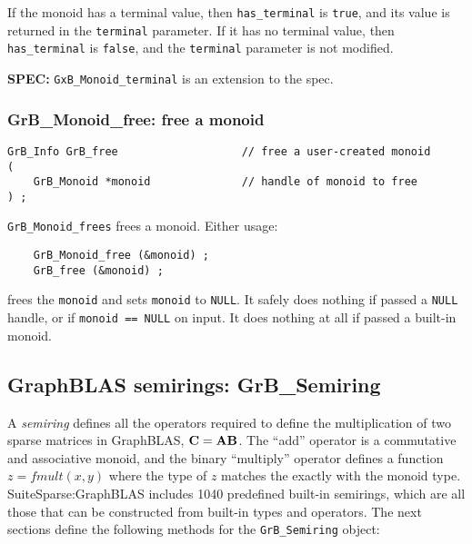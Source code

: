 \documentclass[12pt]{article}
\begin{document}
If the monoid has a terminal value, then \verb'has_terminal' is \verb'true',
and its value is returned in the \verb'terminal' parameter.  If it has no
terminal value, then \verb'has_terminal' is \verb'false', and the
\verb'terminal' parameter is not modified.

\begin{spec}
{\bf SPEC:} \verb'GxB_Monoid_terminal' is an extension to the spec.
\end{spec}

\subsubsection{{\sf GrB\_Monoid\_free:} free a monoid}
\label{monoid_free}

\begin{mdframed}[userdefinedwidth=6in]
{\footnotesize
\begin{verbatim}
GrB_Info GrB_free                   // free a user-created monoid
(
    GrB_Monoid *monoid              // handle of monoid to free
) ;
\end{verbatim}
} \end{mdframed}

\verb'GrB_Monoid_frees' frees a monoid.  Either usage:

    {\small
    \begin{verbatim}
    GrB_Monoid_free (&monoid) ;
    GrB_free (&monoid) ; \end{verbatim}}

\noindent
frees the \verb'monoid' and sets \verb'monoid' to \verb'NULL'.  It safely does
nothing if passed a \verb'NULL' handle, or if \verb'monoid == NULL' on input.
It does nothing at all if passed a built-in monoid.

\newpage
\subsection{GraphBLAS semirings: {\sf GrB\_Semiring}} %
\label{semiring}

A {\em semiring} defines all the operators required to define the
multiplication of two sparse matrices in GraphBLAS, ${\bf C=AB}$.  The ``add''
operator is a commutative and associative monoid, and the binary ``multiply''
operator defines a function $z=fmult(x,y)$ where the type of $z$ matches the
exactly with the monoid type.  SuiteSparse:GraphBLAS includes 1040
predefined built-in semirings, which are all those that can be constructed
from built-in types and operators.  The next sections define the following
methods for the \verb'GrB_Semiring' object:
\end{document}
